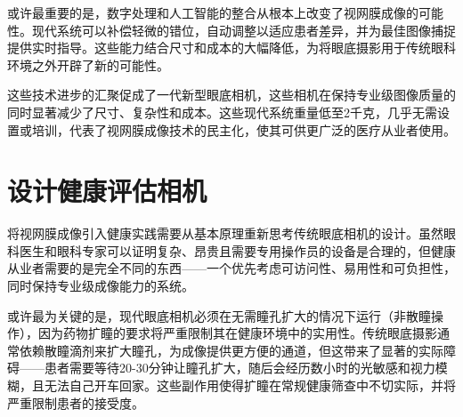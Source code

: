 \documentclass[
  Letterpaper,
]{scrbook}
\begin{document}
或许最重要的是，数字处理和人工智能的整合从根本上改变了视网膜成像的可能性。现代系统可以补偿轻微的错位，自动调整以适应患者差异，并为最佳图像捕捉提供实时指导。这些能力结合尺寸和成本的大幅降低，为将眼底摄影用于传统眼科环境之外开辟了新的可能性。

这些技术进步的汇聚促成了一代新型眼底相机，这些相机在保持专业级图像质量的同时显著减少了尺寸、复杂性和成本。这些现代系统重量低至2千克，几乎无需设置或培训，代表了视网膜成像技术的民主化，使其可供更广泛的医疗从业者使用。

\section{设计健康评估相机}\label{ux8bbeux8ba1ux5065ux5eb7ux8bc4ux4f30ux76f8ux673a}

将视网膜成像引入健康实践需要从基本原理重新思考传统眼底相机的设计。虽然眼科医生和眼科专家可以证明复杂、昂贵且需要专用操作员的设备是合理的，但健康从业者需要的是完全不同的东西------一个优先考虑可访问性、易用性和可负担性，同时保持专业级成像能力的系统。

或许最为关键的是，现代眼底相机必须在无需瞳孔扩大的情况下运行（非散瞳操作），因为药物扩瞳的要求将严重限制其在健康环境中的实用性。传统眼底摄影通常依赖散瞳滴剂来扩大瞳孔，为成像提供更方便的通道，但这带来了显著的实际障碍------患者需要等待20-30分钟让瞳孔扩大，随后会经历数小时的光敏感和视力模糊，且无法自己开车回家。这些副作用使得扩瞳在常规健康筛查中不切实际，并将严重限制患者的接受度。
\end{document}
